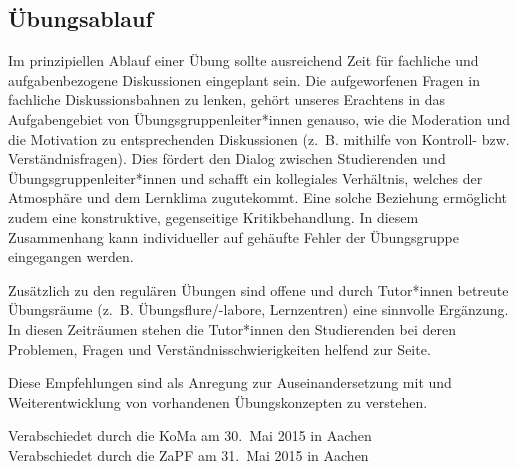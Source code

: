 \documentclass[DIV=calc]{scrartcl}
\renewcommand{\headrulewidth}{0pt}
\begin{document}
\subsection*{Übungsablauf}
Im prinzipiellen Ablauf einer Übung sollte ausreichend Zeit für fachliche und aufgabenbezogene Diskussionen eingeplant sein. Die aufgeworfenen Fragen in fachliche Diskussionsbahnen zu lenken, gehört unseres Erachtens in das Aufgabengebiet von Übungsgruppenleiter*innen genauso, wie die Moderation und die Motivation zu entsprechenden Diskussionen (z.~B. mithilfe von Kontroll- bzw. Verständnisfragen). Dies fördert den Dialog zwischen Studierenden und Übungsgruppenleiter*innen und schafft ein kollegiales Verhältnis, welches der Atmosphäre und dem Lernklima zugutekommt. Eine solche Beziehung ermöglicht zudem eine konstruktive, gegenseitige Kritikbehandlung. In diesem Zusammenhang kann individueller auf gehäufte Fehler der Übungsgruppe eingegangen werden.

Zusätzlich zu den regulären Übungen sind offene und durch Tutor*innen betreute Übungsräume (z.~B. Übungsflure/-labore, Lernzentren) eine sinnvolle Ergänzung. In diesen Zeiträumen stehen die Tutor*innen den Studierenden bei deren Problemen, Fragen und Verständnisschwierigkeiten helfend zur Seite.

\vspace{1cm}
Diese Empfehlungen sind als Anregung zur Auseinandersetzung mit und Weiterentwicklung von vorhandenen Übungskonzepten zu verstehen.

\vfill
\begin{flushright}
Verabschiedet durch die KoMa am 30.~Mai 2015 in Aachen\\
Verabschiedet durch die ZaPF am 31.~Mai 2015 in Aachen
\end{flushright}
\end{document}
